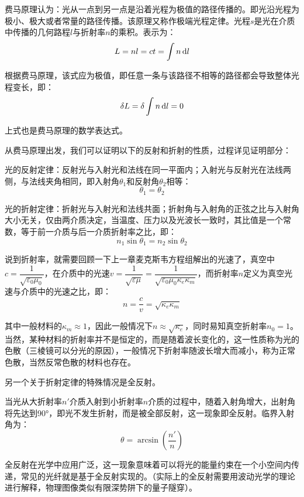 费马原理认为：光从一点到另一点是沿着光程为极值的路径传播的。即光沿光程为极小、极大或者常量的路径传播。该原理又称作极端光程定律。光程$s$是光在介质中传播的几何路程$l$与折射率$n$的乘积。表示为：
\[L = nl = ct = \int n \dif{l}\]

根据费马原理，该式应为极值，即任意一条与该路径不相等的路径都会导致整体光程变长，即：
\[\delta L = \delta \int n\dif{l} = 0\]

上式也是费马原理的数学表达式。

从费马原理出发，我们可以证明以下的反射和折射的性质，过程详见证明部分：
\begin{law}
    光的反射定律：反射光与入射光和法线在同一平面内；入射光与反射光在法线两侧，与法线夹角相同，即入射角$\theta_1$和反射角$\theta_2$相等：
    \[\theta_1=\theta_2\]
\end{law}
\begin{law}
    光的折射定律：折射光与入射光和法线共面；折射角与入射角的正弦之比与入射角大小无关，仅由两介质决定，当温度、压力以及光波长一致时，其比值是一个常数，等于前一介质与后一介质折射率之比，即：
    \[n_1 \sin\theta_1= n_2\sin\theta_2\]
\end{law}

说到折射率，就需要回顾一下上一章麦克斯韦方程组解出的光速了，真空中$c = \dfrac{1}{\sqrt{\varepsilon_0\mu_0}}$，在介质中的光速$v = \dfrac{1}{\sqrt{\varepsilon\mu}}=\dfrac{1}{\sqrt{\varepsilon_0\mu_0\kappa_e\kappa_m}}$，而折射率$n$定义为真空光速与介质中的光速之比，即：
\[n = \dfrac{c}{v} = \sqrt{\kappa_e\kappa_m}\]

其中一般材料的$\kappa_m \approx 1$，因此一般情况下$n\approx \sqrt{\kappa_e}$，同时易知真空折射率$n_0 = 1$。当然，某种材料的折射率并不是恒定的，而是随着波长变化的，这一性质称为光的色散（三棱镜可以分光的原因），一般情况下折射率随波长增大而减小，称为正常色散，当然反常色散的材料也存在。

另一个关于折射定律的特殊情况是全反射。
\begin{law}
    当光从大折射率$n'$介质入射到小折射率$n$介质的过程中，随着入射角增大，出射角将先达到90°，即光不发生折射，而是被全部反射，这一现象即全反射。临界入射角为：
    \[\theta = \arcsin(\dfrac{n'}{n})\]
\end{law}

全反射在光学中应用广泛，这一现象意味着可以将光的能量约束在一个小空间内传递，常见的光纤就是基于全反射实现的。（实际上的全反射需要用波动光学的理论进行解释，物理图像类似有限深势阱下的量子隧穿）。

